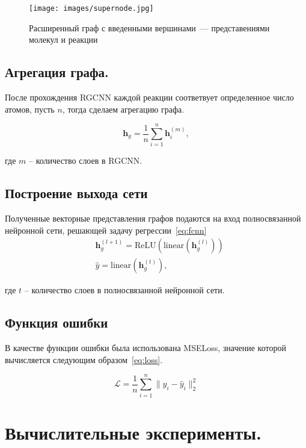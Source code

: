 \documentclass[12pt, twoside]{article}
\begin{document}
\begin{figure}[h]
    \centering
    \texttt{[image: images/supernode.jpg]}
    \caption{Расширенный граф с введенными вершинами~--- представениями молекул и реакции}
    \label{fg:supernode_graph}
\end{figure}


\subsection{Агрегация графа.}

После прохождения RGCNN каждой реакции соответвует определенное число атомов, пусть $n$, тогда сделаем агрегацию графа.

\begin{equation}
    \mathbf{h}_g = \dfrac{1}{n}\sum_{i = 1}^{n}\mathbf{h}_i^{(m)},
\end{equation}

где $m$ -- количество слоев в RGCNN.

\subsection{Построение выхода сети}


Полученные векторные представления графов подаются на вход полносвязанной нейронной сети, решающей задачу регрессии~\eqref{eq:fcnn}
\begin{align}
    &\mathbf{h}_g^{(l+1)} = \text{ReLU}(\text{linear}(\mathbf{h}_g^{(l)}))\\
    &\hat{y} = \text{linear}({\mathbf{h}^{(t)}_g}),
    \label{eq:fcnn}
\end{align}

где $t$ -- количество слоев в полносвязанной нейронной сети.

\subsection{Функция ошибки}

В качестве функции ошибки была использована MSELoss, значение которой вычисляется следующим образом~\eqref{eq:loss}.

\begin{equation}
    \mathcal{L} = \dfrac{1}{n}\sum_{i = 1}^{n}\|y_i - \hat{y}_i\|_2^2
    \label{eq:loss}
\end{equation}

\section{Вычислительные эксперименты.}
\end{document}
